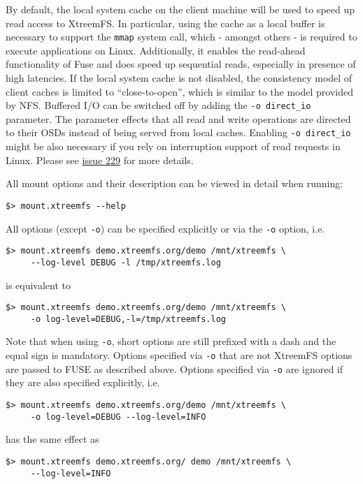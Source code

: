 \documentclass[a4paper,10pt]{book}
\begin{document}
By default, the local system cache on the client machine will be used to speed up read access to XtreemFS. In particular, using the cache as a local buffer is necessary to support the \texttt{mmap} system call, which - amongst others - is required to execute applications on Linux. Additionally, it enables the read-ahead functionality of Fuse and does speed up sequential reads, especially in presence of high latencies. If the local system cache is not disabled, the consistency model of client caches is limited to ``close-to-open'', which is similar to the model provided by NFS. Buffered I/O can be switched off by adding the \texttt{-o direct\_io} parameter. The parameter effects that all read and write operations are directed to their OSDs instead of being served from local caches. Enabling \texttt{-o direct\_io} might be also necessary if you rely on interruption support of read requests in Linux. Please see \href{https://github.com/xtreemfs/xtreemfs/issues/229}{issue 229} for more details.

All mount options and their description can be viewed in detail when running:
\begin{verbatim}
$> mount.xtreemfs --help
\end{verbatim}

All options (except \texttt{-o}) can be specified explicitly or via the \texttt{-o} option, i.e.
\begin{verbatim}
$> mount.xtreemfs demo.xtreemfs.org/demo /mnt/xtreemfs \
     --log-level DEBUG -l /tmp/xtreemfs.log
\end{verbatim}
is equivalent to
\begin{verbatim}
$> mount.xtreemfs demo.xtreemfs.org/demo /mnt/xtreemfs \
     -o log-level=DEBUG,-l=/tmp/xtreemfs.log
\end{verbatim}
Note that when using \texttt{-o}, short options are still prefixed with a dash and the equal sign is mandatory. Options specified via \texttt{-o} that are not XtreemFS options are passed to FUSE as described above. Options specified via \texttt{-o} are ignored if they are also specified explicitly, i.e.
\begin{verbatim}
$> mount.xtreemfs demo.xtreemfs.org/demo /mnt/xtreemfs \
     -o log-level=DEBUG --log-level=INFO
\end{verbatim}
has the same effect as
\begin{verbatim}
$> mount.xtreemfs demo.xtreemfs.org/ demo /mnt/xtreemfs \
     --log-level=INFO
\end{verbatim}
\end{document}
